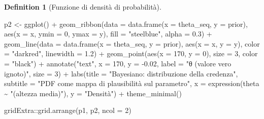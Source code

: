 \documentclass[
  letterpaper,
  DIV=11,
  numbers=noendperiod,
  oneside]{scrreprt}
\newenvironment{Shaded}{\begin{snugshade}}{\end{snugshade}}
\newcommand{\AttributeTok}[1]{\textcolor[rgb]{0.40,0.45,0.13}{#1}}
\newcommand{\DecValTok}[1]{\textcolor[rgb]{0.68,0.00,0.00}{#1}}
\newcommand{\FloatTok}[1]{\textcolor[rgb]{0.68,0.00,0.00}{#1}}
\newcommand{\FunctionTok}[1]{\textcolor[rgb]{0.28,0.35,0.67}{#1}}
\newcommand{\NormalTok}[1]{\textcolor[rgb]{0.00,0.23,0.31}{#1}}
\newcommand{\OtherTok}[1]{\textcolor[rgb]{0.00,0.23,0.31}{#1}}
\newcommand{\SpecialCharTok}[1]{\textcolor[rgb]{0.37,0.37,0.37}{#1}}
\newcommand{\StringTok}[1]{\textcolor[rgb]{0.13,0.47,0.30}{#1}}
\theoremstyle{definition}
\theoremstyle{plain}
\theoremstyle{definition}
\newtheorem{definition}{Definition}[chapter]
\theoremstyle{remark}
\begin{document}
\begin{definition}[Funzione di densità di
probabilità]
\begin{Shaded}
\begin{Highlighting}[]
\NormalTok{p2 }\OtherTok{\textless{}{-}} \FunctionTok{ggplot}\NormalTok{() }\SpecialCharTok{+}
  \FunctionTok{geom\_ribbon}\NormalTok{(}\AttributeTok{data =} \FunctionTok{data.frame}\NormalTok{(}\AttributeTok{x =}\NormalTok{ theta\_seq, }\AttributeTok{y =}\NormalTok{ prior),}
              \FunctionTok{aes}\NormalTok{(}\AttributeTok{x =}\NormalTok{ x, }\AttributeTok{ymin =} \DecValTok{0}\NormalTok{, }\AttributeTok{ymax =}\NormalTok{ y), }
              \AttributeTok{fill =} \StringTok{"steelblue"}\NormalTok{, }\AttributeTok{alpha =} \FloatTok{0.3}\NormalTok{) }\SpecialCharTok{+}
  \FunctionTok{geom\_line}\NormalTok{(}\AttributeTok{data =} \FunctionTok{data.frame}\NormalTok{(}\AttributeTok{x =}\NormalTok{ theta\_seq, }\AttributeTok{y =}\NormalTok{ prior),}
            \FunctionTok{aes}\NormalTok{(}\AttributeTok{x =}\NormalTok{ x, }\AttributeTok{y =}\NormalTok{ y), }\AttributeTok{color =} \StringTok{"darkred"}\NormalTok{, }\AttributeTok{linewidth =} \FloatTok{1.2}\NormalTok{) }\SpecialCharTok{+}
  \FunctionTok{geom\_point}\NormalTok{(}\FunctionTok{aes}\NormalTok{(}\AttributeTok{x =} \DecValTok{170}\NormalTok{, }\AttributeTok{y =} \DecValTok{0}\NormalTok{), }\AttributeTok{size =} \DecValTok{3}\NormalTok{, }\AttributeTok{color =} \StringTok{"black"}\NormalTok{) }\SpecialCharTok{+}
  \FunctionTok{annotate}\NormalTok{(}\StringTok{"text"}\NormalTok{, }\AttributeTok{x =} \DecValTok{170}\NormalTok{, }\AttributeTok{y =} \SpecialCharTok{{-}}\FloatTok{0.02}\NormalTok{, }\AttributeTok{label =} \StringTok{"θ (valore vero ignoto)"}\NormalTok{, }\AttributeTok{size =} \DecValTok{3}\NormalTok{) }\SpecialCharTok{+}
  \FunctionTok{labs}\NormalTok{(}\AttributeTok{title =} \StringTok{"Bayesiano: distribuzione della credenza"}\NormalTok{,}
       \AttributeTok{subtitle =} \StringTok{"PDF come mappa di plausibilità sul parametro"}\NormalTok{,}
       \AttributeTok{x =} \FunctionTok{expression}\NormalTok{(theta }\SpecialCharTok{\textasciitilde{}} \StringTok{"(altezza media)"}\NormalTok{), }\AttributeTok{y =} \StringTok{"Densità"}\NormalTok{) }\SpecialCharTok{+}
  \FunctionTok{theme\_minimal}\NormalTok{()}

\NormalTok{gridExtra}\SpecialCharTok{::}\FunctionTok{grid.arrange}\NormalTok{(p1, p2, }\AttributeTok{ncol =} \DecValTok{2}\NormalTok{)}
\end{Highlighting}
\end{Shaded}

\begin{figure}[H]

\centering{

}
\end{figure}
\end{definition}
\end{document}
